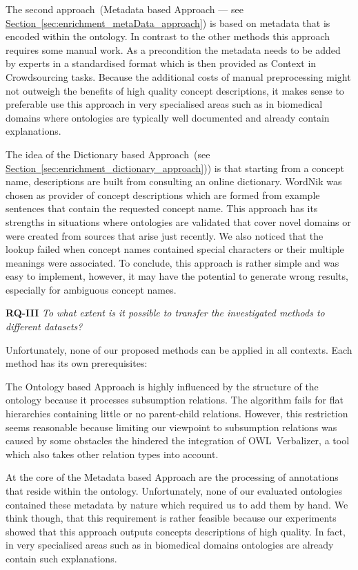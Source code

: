 The second approach~(Metadata based Approach --- see \hyperref[sec:enrichment_metaData_approach]{Section~\ref*{sec:enrichment_metaData_approach}})
is based on metadata that is encoded within the ontology. In contrast to the other methods this approach requires some manual work. As a precondition 
the metadata needs to be added by experts in a standardised format which is then provided as Context in Crowdsourcing tasks. Because the additional costs of manual preprocessing might not outweigh the benefits of high quality concept descriptions, it makes sense to preferable use this approach in very specialised areas such as in biomedical domains where ontologies are typically well documented and already contain explanations.

The idea of the Dictionary based Approach~(see \hyperref[sec:enrichment_dictionary_approach]{Section~\ref*{sec:enrichment_dictionary_approach}}))
is that starting from a concept name, descriptions are built from consulting an online dictionary. WordNik was chosen as provider of concept descriptions which are formed from example sentences that contain the requested concept name. This approach has its strengths in situations where ontologies are validated that cover novel domains or were created from sources that arise just recently. We also noticed that the lookup failed when concept names contained special characters or their multiple meanings were associated. 
To conclude, this approach is rather simple and was easy to implement, however, it may have the potential to generate wrong results, especially for ambiguous concept names. 


\textbf{RQ-III} \emph{To what extent is it possible to transfer the investigated methods to different datasets?}

Unfortunately, none of our proposed methods can be applied in all contexts. Each method has its own prerequisites:

The Ontology based Approach is highly influenced by the structure of the ontology because it processes subsumption relations. The algorithm fails 
for flat hierarchies containing little or no parent-child relations. However, this restriction seems reasonable because limiting our viewpoint to subsumption relations was caused by some obstacles the hindered the integration of OWL~Verbalizer, a tool which also takes other relation types into account. 

At the core of the Metadata based Approach are the processing of annotations that reside within the ontology. Unfortunately, none of our evaluated ontologies contained these metadata by nature which required us to add them by hand. We think though, that this requirement is rather feasible because our experiments showed that this approach outputs concepts descriptions of high quality.  In fact, in very specialised areas such as in biomedical domains ontologies are already contain such explanations. 

